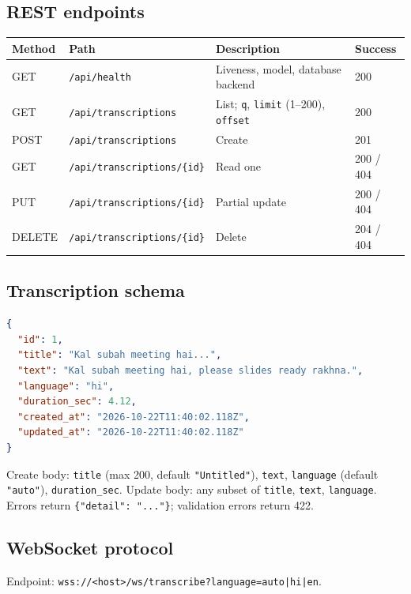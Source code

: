 \documentclass[11pt,a4paper]{article}
\begin{document}
\subsection{REST endpoints}
\begin{table}[H]
\centering
\begin{tabularx}{\linewidth}{@{}llXl@{}}
\toprule
\textbf{Method} & \textbf{Path} & \textbf{Description} & \textbf{Success}\\
\midrule
GET & \texttt{/api/health} & Liveness, model, database backend & 200\\
GET & \texttt{/api/transcriptions} & List; \texttt{q}, \texttt{limit} (1--200), \texttt{offset} & 200\\
POST & \texttt{/api/transcriptions} & Create & 201\\
GET & \texttt{/api/transcriptions/\{id\}} & Read one & 200 / 404\\
PUT & \texttt{/api/transcriptions/\{id\}} & Partial update & 200 / 404\\
DELETE & \texttt{/api/transcriptions/\{id\}} & Delete & 204 / 404\\
\bottomrule
\end{tabularx}
\end{table}

\subsection{Transcription schema}
\begin{lstlisting}[language=json]
{
  "id": 1,
  "title": "Kal subah meeting hai...",
  "text": "Kal subah meeting hai, please slides ready rakhna.",
  "language": "hi",
  "duration_sec": 4.12,
  "created_at": "2026-10-22T11:40:02.118Z",
  "updated_at": "2026-10-22T11:40:02.118Z"
}
\end{lstlisting}
Create body: \texttt{title} (max 200, default \texttt{"Untitled"}), \texttt{text}, \texttt{language}
(default \texttt{"auto"}), \texttt{duration\_sec}. Update body: any subset of \texttt{title},
\texttt{text}, \texttt{language}. Errors return \texttt{\{"detail": "..."\}}; validation errors return 422.

\subsection{WebSocket protocol}
Endpoint: \texttt{wss://<host>/ws/transcribe?language=auto|hi|en}.
\end{document}
